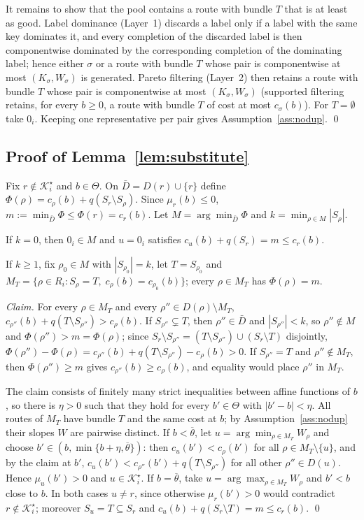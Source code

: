 \documentclass[review,12pt]{elsarticle}
\theoremstyle{definition}
\theoremstyle{remark}
\newcommand{\Kstar}{\mathcal{K}^\star}
\newcommand{\uth}{\overline{\theta}}
\begin{document}
It remains to show that the pool contains a route with bundle $T$ that is at
least as good. Label dominance (Layer~1) discards a label only if a label
with the same key dominates it, and every completion of the discarded label
is then componentwise dominated by the corresponding completion of the
dominating label; hence either $\sigma$ or a route with bundle $T$ whose pair
is componentwise at most $(K_\sigma,W_\sigma)$ is generated. Pareto
filtering (Layer~2) then retains a route with bundle $T$ whose pair is
componentwise at most $(K_\sigma,W_\sigma)$ (supported filtering retains,
for every $b\ge0$, a route with bundle $T$ of cost at most $c_\sigma(b)$).
For $T=\emptyset$ take $0_i$. Keeping one representative per pair gives
Assumption~\ref{ass:nodup}. \qed

\subsection{Proof of Lemma~\ref{lem:substitute}}

Fix $r\notin\Kstar_i$ and $b\in\Theta$. On $\bar D=D(r)\cup\{r\}$ define
$\Phi(\rho)=c_\rho(b)+q(S_r\setminus S_\rho)$. Since $\mu_r(b)\le 0$,
$m:=\min_{\bar D}\Phi\le\Phi(r)=c_r(b)$. Let $M=\arg\min_{\bar D}\Phi$ and
$k=\min_{\rho\in M}|S_\rho|$.

If $k=0$, then $0_i\in M$ and $u=0_i$ satisfies $c_u(b)+q(S_r)=m\le c_r(b)$.

If $k\ge 1$, fix $\rho_0\in M$ with $|S_{\rho_0}|=k$, let $T=S_{\rho_0}$ and
$M_T=\{\rho\in R_i:S_\rho=T,\;c_\rho(b)=c_{\rho_0}(b)\}$; every
$\rho\in M_T$ has $\Phi(\rho)=m$.

\emph{Claim.} For every $\rho\in M_T$ and every $\rho''\in D(\rho)\setminus M_T$,
$c_{\rho''}(b)+q(T\setminus S_{\rho''})>c_\rho(b)$. If $S_{\rho''}\subsetneq T$,
then $\rho''\in\bar D$ and $|S_{\rho''}|<k$, so $\rho''\notin M$ and
$\Phi(\rho'')>m=\Phi(\rho)$; since
$S_r\setminus S_{\rho''}=(T\setminus S_{\rho''})\cup(S_r\setminus T)$ disjointly,
$\Phi(\rho'')-\Phi(\rho)=c_{\rho''}(b)+q(T\setminus S_{\rho''})-c_\rho(b)>0$. If
$S_{\rho''}=T$ and $\rho''\notin M_T$, then $\Phi(\rho'')\ge m$ gives
$c_{\rho''}(b)\ge c_\rho(b)$, and equality would place $\rho''$ in $M_T$.

The claim consists of finitely many strict inequalities between affine
functions of $b$, so there is $\eta>0$ such that they hold for every
$b'\in\Theta$ with $|b'-b|<\eta$. All routes of $M_T$ have bundle $T$ and the
same cost at $b$; by Assumption~\ref{ass:nodup} their slopes $W$ are
pairwise distinct. If $b<\uth$, let $u=\arg\min_{\rho\in M_T}W_\rho$ and choose
$b'\in(b,\min\{b+\eta,\uth\})$: then $c_u(b')<c_\rho(b')$ for all
$\rho\in M_T\setminus\{u\}$, and by the claim at $b'$,
$c_u(b')<c_{\rho''}(b')+q(T\setminus S_{\rho''})$ for all other
$\rho''\in D(u)$. Hence $\mu_u(b')>0$ and $u\in\Kstar_i$. If $b=\uth$, take
$u=\arg\max_{\rho\in M_T}W_\rho$ and $b'<b$ close to $b$. In both cases
$u\ne r$, since otherwise $\mu_r(b')>0$ would contradict $r\notin\Kstar_i$;
moreover $S_u=T\subseteq S_r$ and $c_u(b)+q(S_r\setminus T)=m\le c_r(b)$.
\qed
\end{document}
